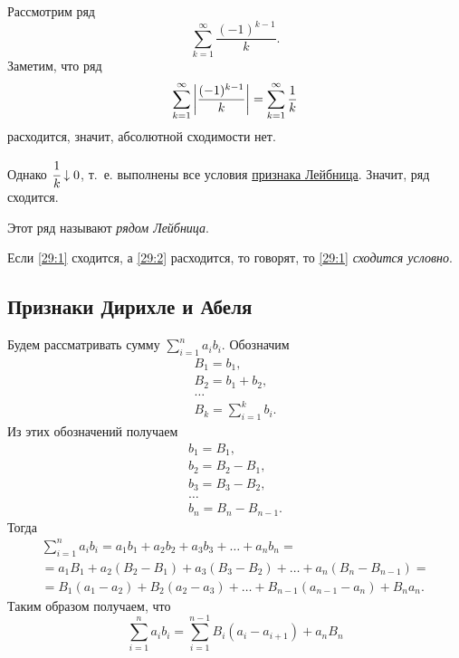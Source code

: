 \documentclass[../../main.tex]{subfiles}
\begin{document}
	\begin{example}
		Рассмотрим ряд
		\[\sum_{k = 1}^\infty\frac{(-1)^{k - 1}}{k}.\]
		Заметим, что ряд
		\[\sum_{k = 1}^\infty\left|{\frac{(-1)^{k - 1}}{k}}\right| = 
		\sum_{k = 1}^\infty\frac{1}{k}\]
		расходится, значит, абсолютной сходимости нет.
		
		Однако $\cfrac{1}{k}\downarrow0$, 
		т.~е. выполнены все условия \hyperref[29:leibnitz]{признака Лейбница}. 
		Значит, 
		ряд сходится.
		
		Этот ряд называют \emph{рядом Лейбница}.
	\end{example}

\begin{definition}
	Если \eqref{29:1} сходится, а \eqref{29:2} расходится, то говорят, то 
	\eqref{29:1} \emph{сходится условно}.
\end{definition}
	
	\subsection{Признаки Дирихле и Абеля}
	
	Будем рассматривать сумму $\sum\limits_{i = 1}^n a_ib_i$. Обозначим
	\begin{gather*}
	 B_1 = b_1, \\
	 B_2 = b_1 + b_2, \\
	 \ldots \\
	 B_k = \sum_{i=1}^k b_i.
	\end{gather*}
	Из этих обозначений получаем
	\begin{gather*}
	 b_1 = B_1, \\
	 b_2 = B_2 - B_1, \\
	 b_3 = B_3 - B_2, \\
	 \ldots \\
	 b_n = B_n - B_{n - 1}.
	\end{gather*}
	Тогда
	\begin{gather*}
		\sum_{i = 1}^n a_ib_i = a_1b_1 + a_2b_2 + a_3b_3 + \ldots + a_nb_n = \\
		= a_1B_1 + a_2(B_2 - B_1) + a_3(B_3 - B_2) + \ldots + a_n(B_n - B_{n - 1}) = 
		\\
		= B_1(a_1 - a_2) + B_2(a_2 - a_3) + \ldots + B_{n - 1}(a_{n - 1} - a_n) 
		+ B_na_n.
	\end{gather*}
	Таким образом получаем, что
	\begin{equation}
		\sum_{i = 1}^na_ib_i = \sum_{i = 1}^{n - 1}B_i(a_i - a_{i + 1}) + a_nB_n
		\label{29:7}
	\end{equation}
	
\end{document}
